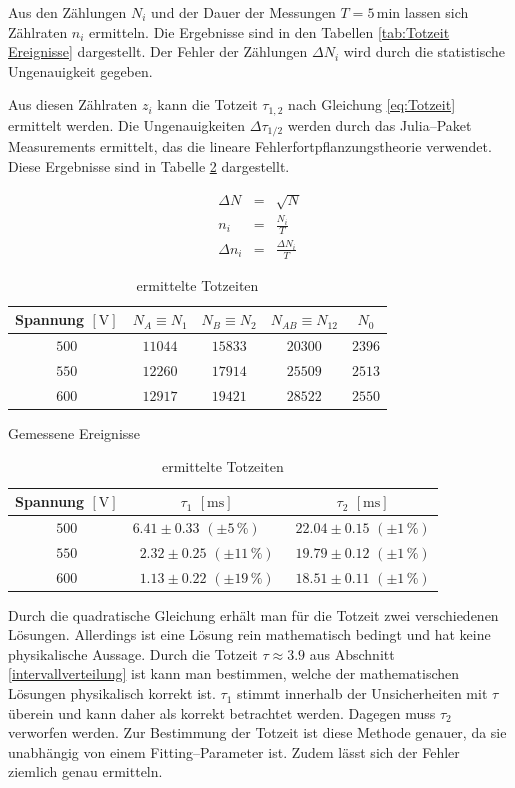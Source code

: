 \documentclass[12pt,a4paper]{scrartcl}
\numberwithin{equation}{section} %
\newcommand{\code}[1]{\textsf{#1}}
\begin{document}
Aus den Zählungen $N_i$ und der Dauer der Messungen $T=5\mathrm{\,min}$ lassen sich Zählraten $n_i$ ermitteln. Die Ergebnisse sind in den Tabellen \ref{tab:Totzeit Ereignisse} dargestellt. Der Fehler der Zählungen $\Delta N_i$ wird durch die statistische Ungenauigkeit gegeben.

Aus diesen Zählraten $z_i$ kann die Totzeit $\tau_{1,2}$ nach Gleichung \eqref{eq:Totzeit} ermittelt werden. Die Ungenauigkeiten $\Delta \tau_{1/2}$ werden durch das \code{Julia}--Paket \code{Measurements} ermittelt, das die lineare Fehlerfortpflanzungstheorie verwendet. \cite{Julia:Measurements} Diese Ergebnisse sind in Tabelle \ref{tab:Totzeiten} dargestellt.

\begin{eqnarray}
	\Delta N &=& \sqrt{N} \\
	n_i &=& \frac{N_i}{T} \\
	\Delta n_i &=& \frac{\Delta N_i}{T}
\end{eqnarray}

\begin{table}[h!]
	\centering
	\begin{tabular}[h]{c|c|c|c|c}
		Spannung $[\mathrm V]$
			& $N_A\equiv N_1$
			& $N_B\equiv N_2$
			& $N_{AB}\equiv N_{12}$
			& $N_0$ \\
		\hline
		$500$ & $11044$ & $15833$ & $20300$ & $2396$ \\
		$550$ & $12260$ & $17914$ & $25509$ & $2513$ \\
		$600$ & $12917$ & $19421$ & $28522$ & $2550$ \\
	\end{tabular}
	\caption{Gemessene Ereignisse}
	\label{tab:Totzeit Ereignisse}
	\vspace{12pt}

	\begin{tabular}[h]{c|c|c}
		Spannung $[\mathrm V]$
		& $\tau_1$ $[\mathrm{ms}]$
		& $\tau_2$ $[\mathrm{ms}]$ \\
		\hline
		$500$ & $6.41 \pm 0.33$ $(\pm 5 \,\%)$\ \ \  & $22.04 \pm 0.15$ $(\pm 1 \,\%)$ \\
		$550$ & $2.32 \pm 0.25$ $(\pm 11 \,\%)$ & $19.79 \pm 0.12$ $(\pm 1 \,\%)$ \\
		$600$ & $1.13 \pm 0.22$ $(\pm 19 \,\%)$ & $18.51 \pm 0.11$ $(\pm 1 \,\%)$ \\
	\end{tabular}
	\caption{ermittelte Totzeiten}
	\label{tab:Totzeiten}
\end{table}

\noindent
Durch die quadratische Gleichung erhält man für die Totzeit zwei verschiedenen Lösungen. Allerdings ist eine Lösung rein mathematisch bedingt und hat keine physikalische Aussage. Durch die Totzeit $\tau\approx 3.9$ aus Abschnitt \ref{intervallverteilung} ist kann man bestimmen, welche der mathematischen Lösungen physikalisch korrekt ist. $\tau _1$ stimmt innerhalb der Unsicherheiten mit $\tau$ überein und kann daher als korrekt betrachtet werden. Dagegen muss $\tau _2$ verworfen werden. Zur Bestimmung der Totzeit ist diese Methode genauer, da sie unabhängig von einem Fitting--Parameter ist. Zudem lässt sich der Fehler ziemlich genau ermitteln.
\end{document}
